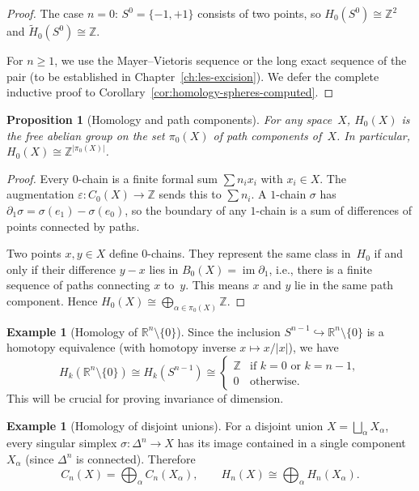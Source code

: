 \documentclass[12pt,a4paper,openany]{book}
\theoremstyle{definition}
\newtheorem{example}[definition]{Example}
\theoremstyle{plain}
\newtheorem{proposition}[definition]{Proposition}
\theoremstyle{remark}
\newcommand{\Z}{\mathbb{Z}}
\newcommand{\R}{\mathbb{R}}
\DeclareMathOperator{\im}{im}
\newcommand{\abs}[1]{\left|#1\right|}
\begin{document}
\begin{proof}
The case $n=0$: $S^0=\{-1,+1\}$ consists of two points, so
$H_0(S^0)\cong\Z^2$ and $\widetilde{H}_0(S^0)\cong\Z$.

For $n\ge 1$, we use the Mayer--Vietoris sequence or the long exact
sequence of the pair (to be established in Chapter~\ref{ch:les-excision}).
We defer the complete inductive proof to
Corollary~\ref{cor:homology-spheres-computed}.
\end{proof}

\begin{proposition}[Homology and path components]\label{prop:h0-components}
For any space~$X$, $H_0(X)$ is the free abelian group on the set
$\pi_0(X)$ of path components of~$X$.
In particular, $H_0(X)\cong\Z^{\abs{\pi_0(X)}}$.
\end{proposition}

\begin{proof}
Every $0$-chain is a finite formal sum $\sum n_i x_i$ with $x_i\in X$.
The augmentation $\varepsilon\colon C_0(X)\to\Z$ sends this to $\sum n_i$.
A $1$-chain $\sigma$ has $\partial_1\sigma=\sigma(e_1)-\sigma(e_0)$, so the
boundary of any $1$-chain is a sum of differences of points connected by
paths.

Two points $x,y\in X$ define $0$-chains.  They represent the same class
in~$H_0$ if and only if their difference $y-x$ lies in $B_0(X)=\im\partial_1$,
i.e., there is a finite sequence of paths connecting $x$ to~$y$.
This means $x$ and $y$ lie in the same path component.
Hence $H_0(X)\cong\bigoplus_{\alpha\in\pi_0(X)}\Z$.
\end{proof}

\begin{example}[Homology of $\R^n\setminus\{0\}$]\label{ex:homology-Rn-minus-pt}
\index{homology!of $\R^n\setminus\{0\}$}
Since the inclusion $S^{n-1}\hookrightarrow\R^n\setminus\{0\}$ is a
homotopy equivalence (with homotopy inverse $x\mapsto x/\abs{x}$), we have
\[
  H_k(\R^n\setminus\{0\})\cong H_k(S^{n-1})\cong
  \begin{cases}
    \Z & \text{if } k=0 \text{ or } k=n-1,\\
    0  & \text{otherwise}.
  \end{cases}
\]
This will be crucial for proving invariance of dimension.
\end{example}

\begin{example}[Homology of disjoint unions]\label{ex:disjoint-union}
For a disjoint union $X=\bigsqcup_{\alpha}X_\alpha$, every singular simplex
$\sigma\colon\Delta^n\to X$ has its image contained in a single component
$X_\alpha$ (since $\Delta^n$ is connected).  Therefore
\[
  C_n(X)=\bigoplus_\alpha C_n(X_\alpha),\qquad
  H_n(X)\cong\bigoplus_\alpha H_n(X_\alpha).
\]
\end{example}
\end{document}
